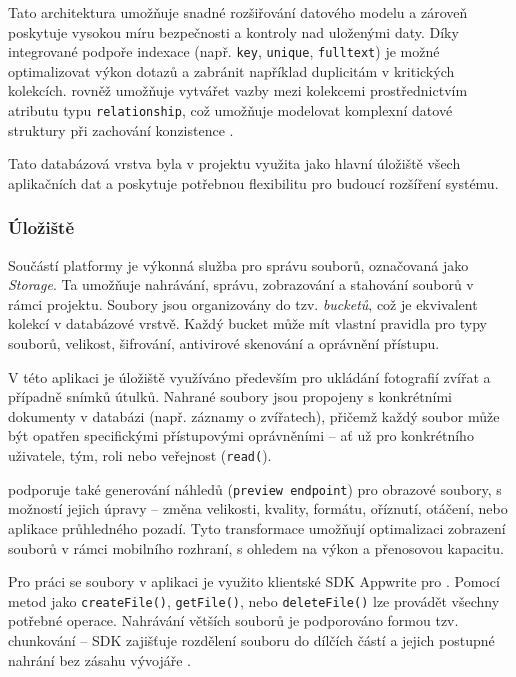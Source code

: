 \documentclass[czech, bp, kiv, he, iso690numb, pdf]{fasthesis}
\begin{document}
    Tato architektura umožňuje snadné rozšiřování datového modelu a zároveň poskytuje vysokou míru bezpečnosti a kontroly nad uloženými daty. Díky integrované podpoře indexace (např. \texttt{key}, \texttt{unique}, \texttt{fulltext}) je možné optimalizovat výkon dotazů a zabránit například duplicitám v kritických kolekcích.  rovněž umožňuje vytvářet vazby mezi kolekcemi prostřednictvím atributu typu \texttt{relationship}, což umožňuje modelovat komplexní datové struktury při zachování konzistence \cite{appwrite-databases}.

    Tato databázová vrstva byla v projektu využita jako hlavní úložiště všech aplikačních dat a poskytuje potřebnou flexibilitu pro budoucí rozšíření systému.



    \subsubsection*{Úložiště}

    Součástí platformy  je výkonná služba pro správu souborů, označovaná jako \textit{Storage}. Ta umožňuje nahrávání, správu, zobrazování a stahování souborů v rámci projektu. Soubory jsou organizovány do tzv. \textit{bucketů}, což je ekvivalent kolekcí v databázové vrstvě. Každý bucket může mít vlastní pravidla pro typy souborů, velikost, šifrování, antivirové skenování a oprávnění přístupu.

    V této aplikaci je úložiště využíváno především pro ukládání fotografií zvířat a případně snímků útulků. Nahrané soubory jsou propojeny s konkrétními dokumenty v databázi (např. záznamy o zvířatech), přičemž každý soubor může být opatřen specifickými přístupovými oprávněními – ať už pro konkrétního uživatele, tým, roli nebo veřejnost (\texttt{read(}).

     podporuje také generování náhledů (\texttt{preview endpoint}) pro obrazové soubory, s možností jejich úpravy – změna velikosti, kvality, formátu, oříznutí, otáčení, nebo aplikace průhledného pozadí. Tyto transformace umožňují optimalizaci zobrazení souborů v rámci mobilního rozhraní, s ohledem na výkon a přenosovou kapacitu.

    Pro práci se soubory v aplikaci je využito klientské SDK Appwrite pro . Pomocí metod jako \texttt{createFile()}, \texttt{getFile()}, nebo \texttt{deleteFile()} lze provádět všechny potřebné operace. Nahrávání větších souborů je podporováno formou tzv. chunkování – SDK zajišťuje rozdělení souboru do dílčích částí a jejich postupné nahrání bez zásahu vývojáře \cite{appwrite-storage}.
\end{document}
